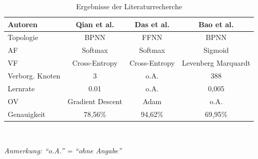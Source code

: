 \documentclass{scrartcl}
\begin{document}
\begin{table}[h!]
   \centering
   \label{tab1}
   \caption{Ergebnisse der Literaturrecherche}
   \begin{tabular}{lccc} \toprule
      Autoren         & Qian et al. \cite{qian} & Das et al.  \cite{das} & Bao et al. \cite{bao} \\ \midrule
      Topologie       & BPNN                    & FFNN                   & BPNN                  \\
      AF              & Softmax                 & Softmax                & Sigmoid               \\
      VF              & Cross-Entropy           & Cross-Entropy          & Levenberg Marquardt   \\
      Verborg. Knoten & $3$                     & o.A.                   & $388$                 \\
      Lernrate        & 0.01                    & o.A.                   & 0,005                 \\
      OV              & Gradient Descent        & Adam                   & o.A.                  \\
      Genauigkeit     & 78,56\%                 & 94,62\%                & 69,95\%               \\
      \bottomrule
   \end{tabular}
   \medskip \\
   {\raggedright \textit{Anmerkung: \enquote{o.A.} = \enquote{ohne Angabe}} \par}
\end{table}
\end{document}
